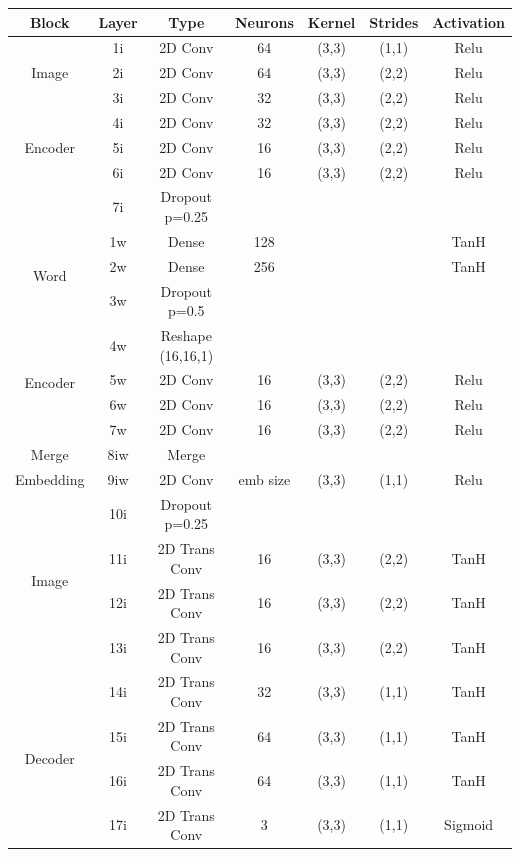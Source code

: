 \begin{table}
		\centering
		\begin{tabular}{|c|c|c|c|c|c|c|}
			\hline
			Block & Layer & Type & Neurons & Kernel & Strides & Activation \\ \hline
			\multirow{3}{*}{Image} & 1i	&	2D Conv & 64 & (3,3) & (1,1) & Relu \\ \cline{2-7}
			& 2i	&	2D Conv & 64 & (3,3) & (2,2) & Relu \\ \cline{2-7}
			& 3i	&	2D Conv & 32 & (3,3) & (2,2) & Relu \\ \cline{2-7}
\multirow{3}{*}{Encoder} & 4i	&	2D Conv & 32 & (3,3) & (2,2) & Relu \\ \cline{2-7}
			& 5i	&	2D Conv & 16 & (3,3) & (2,2) & Relu \\ \cline{2-7}
			& 6i	&	2D Conv & 16 & (3,3) & (2,2) & Relu \\ \cline{2-7}
			& 7i	&	Dropout p=0.25 &	 & 	     &       &  \\ \hline

			\multirow{3}{*}{Word} & 1w	& Dense & 128 & & &TanH \\ \cline{2-7}
			& 2w	& Dense & 256 & & &TanH \\ \cline{2-7}
			& 3w 	&	Dropout p=0.5 &	 & 	     &       & \\ \cline{2-7}
\multirow{4}{*}{Encoder}& 4w  &	Reshape (16,16,1) & & & & \\ \cline{2-7}
			& 5w	&	2D Conv & 16 & (3,3) & (2,2) & Relu \\ \cline{2-7}
			& 6w	&	2D Conv & 16 & (3,3) & (2,2) & Relu \\ \cline{2-7}
			& 7w	&	2D Conv & 16 & (3,3) & (2,2) & Relu \\ \hline

			Merge & 8iw	& Merge & & & & \\ \hline
Embedding & 9iw	&	2D Conv  & emb size & (3,3) & (1,1) & Relu \\ \hline
			
			
			\multirow{4}{*}{Image} & 10i 	&	Dropout p=0.25 &	 & 	     &       & \\ \cline{2-7}
			& 11i	&	2D Trans Conv & 16 & (3,3) & (2,2)  & TanH \\ \cline{2-7}
			& 12i	&	2D Trans Conv & 16 & (3,3) & (2,2)  & TanH \\ \cline{2-7}
			& 13i	&	2D Trans Conv & 16 & (3,3) & (2,2)  & TanH \\ \cline{2-7}
\multirow{4}{*}{Decoder}& 14i	&	2D Trans Conv & 32 & (3,3) & (1,1)  & TanH \\ \cline{2-7}
			& 15i	&	2D Trans Conv & 64 & (3,3) & (1,1)  & TanH \\ \cline{2-7}
			& 16i	&	2D Trans Conv & 64 & (3,3) & (1,1)  & TanH \\ \cline{2-7}
			& 17i	&	2D Trans Conv & 3 & (3,3) & (1,1) & Sigmoid\\ \hline 


\end{tabular}
\end{table}
